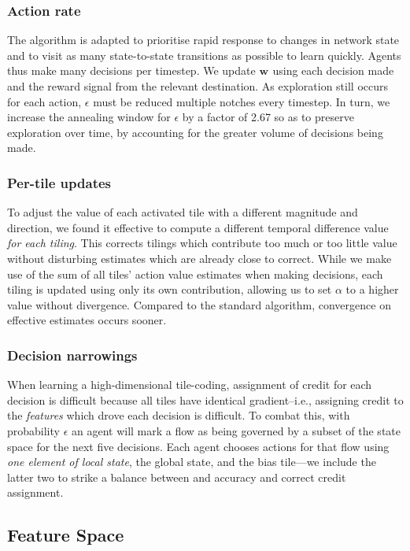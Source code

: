 \documentclass[10pt, times, conference, letterpaper]{IEEEtran}
\newcommand{\wvec}[1]{\ensuremath{\bm{w}_{#1}}}
\begin{document}
\subsubsection{Action rate}
The algorithm is adapted to prioritise rapid response to changes in network state and to visit as many state-to-state transitions as possible to learn quickly.
Agents thus make many decisions per timestep.
We update $\wvec{}$ using each decision made and the reward signal from the relevant destination.
As exploration still occurs for each action, $\epsilon$ must be reduced multiple notches every timestep.
In turn, we increase the annealing window for $\epsilon$ by a factor of \num{2.67} so as to preserve exploration over time, by accounting for the greater volume of decisions being made.

\subsubsection{Per-tile updates}
To adjust the value of each activated tile with a different magnitude and direction, we found it effective to compute a different temporal difference value \emph{for each tiling}.
This corrects tilings which contribute too much or too little value without disturbing estimates which are already close to correct.
While we make use of the sum of all tiles' action value estimates when making decisions, each tiling is updated using only its own contribution, allowing us to set $\alpha$ to a higher value without divergence.
Compared to the standard algorithm, convergence on effective estimates occurs sooner.

\subsubsection{Decision narrowings}
When learning a high-dimensional tile-coding, assignment of credit for each decision is difficult because all tiles have identical gradient--i.e., assigning credit to the \emph{features} which drove each decision is difficult.
To combat this, with probability $\epsilon$ an agent will mark a flow as being governed by a subset of the state space for the next five decisions.
Each agent chooses actions for that flow using \emph{one element of local state}, the global state, and the bias tile---we include the latter two to strike a balance between and accuracy and correct credit assignment.

\subsection{Feature Space}\label{sec:feature-space}
\end{document}

